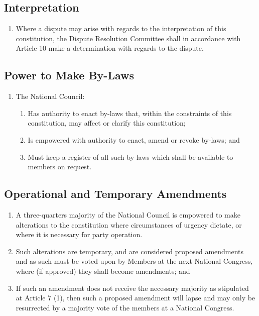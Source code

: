 \documentclass[a4paper,titlepage,8.5pt]{article}
\begin{document}
\subsection{Interpretation}

\begin{enumerate}
\item Where a dispute may arise with regards to the interpretation of this constitution, the Dispute Resolution Committee shall in accordance with Article 10 make a determination with regards to the dispute.
\end{enumerate}

\subsection{Power to Make By-Laws}

\begin{enumerate}
\item The National Council:
\begin{enumerate}
\item Has authority to enact by-laws that, within the constraints of this constitution, may affect or clarify this constitution;
\item Is empowered with authority to enact, amend or revoke by-laws; and
\item Must keep a register of all such by-laws which shall be available to members on request.
\end{enumerate}
\end{enumerate}

\subsection{Operational and Temporary Amendments}

\begin{enumerate}
\item A three-quarters majority of the National Council is empowered to make alterations to the constitution where circumstances of urgency dictate, or where it is necessary for party operation.
\item Such alterations are temporary, and are considered proposed amendments and as such must be voted upon by Members at the next National Congress, where (if approved) they shall become amendments; and
\item If such an amendment does not receive the necessary majority as stipulated at Article 7 (1), then such a proposed amendment will lapse and may only be resurrected by a majority vote of the members at a National Congress.
\end{enumerate}
\end{document}

